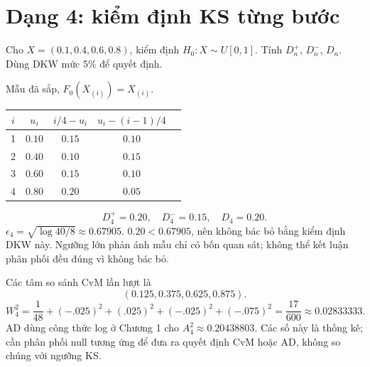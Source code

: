 \section{Dạng 4: kiểm định KS từng bước}
\begin{exercise}\label{ex:ksuniform}
Cho $X=(0.1,0.4,0.6,0.8)$, kiểm định $H_0:X\sim U[0,1]$.
Tính $D_n^+$, $D_n^-$, $D_n$. Dùng DKW mức 5\% để quyết định.
\end{exercise}
\begin{solution}
Mẫu đã sắp, $F_0(X_{(i)})=X_{(i)}$.
\begin{center}
\begin{tabular}{ccccc}
\toprule $i$ & $u_i$ & $i/4-u_i$ & $u_i-(i-1)/4$\\\midrule
1 & $0.10$ & $0.15$ & $0.10$\\
2 & $0.40$ & $0.10$ & $0.15$\\
3 & $0.60$ & $0.15$ & $0.10$\\
4 & $0.80$ & $0.20$ & $0.05$\\\bottomrule
\end{tabular}
\end{center}
\[
\boxed{D_4^+=0.20,\quad D_4^-=0.15,\quad D_4=0.20.}
\]
$\epsilon_4=\sqrt{\log40/8}\approx0.67905$.
$0.20<0.67905$, nên không bác bỏ bằng kiểm định DKW này.
Ngưỡng lớn phản ánh mẫu chỉ có bốn quan sát; không thể kết luận phân
phối đều đúng vì không bác bỏ.

Các tâm so sánh CvM lần lượt là
\[
(0.125,0.375,0.625,0.875).
\]
\[
W_4^2=\frac1{48}+(-.025)^2+(.025)^2+(-.025)^2+(-.075)^2
=\boxed{\frac{17}{600}\approx0.02833333}.
\]
AD dùng công thức log ở Chương 1 cho
$\boxed{A_4^2\approx0.20438803}$.
Các số này là thống kê; cần phân phối null tương ứng để đưa ra quyết định
CvM hoặc AD, không so chúng với ngưỡng KS.
\end{solution}


